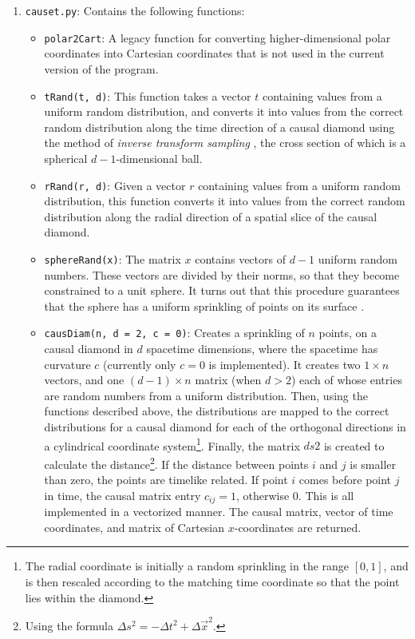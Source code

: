 \documentclass[letterpaper,10pt]{article}
\def\code#1{\texttt{#1}}
\begin{document}
\begin{enumerate}
 \item \code{causet.py}: Contains the following functions:
 \begin{itemize}
  \item \code{polar2Cart}: A legacy function for converting higher-dimensional polar coordinates into Cartesian coordinates that is not used in the 
  current version of the program.
  \item \code{tRand(t, d)}: This function takes a vector $t$ containing values from a uniform random distribution, and converts it into values from  the correct 
  random distribution along the time direction of a causal diamond using the method of {\it inverse transform sampling} \cite{its}, 
  the cross section of which is a spherical $d-1$-dimensional ball. 
  \item \code{rRand(r, d)}: Given a vector $r$ containing values from a uniform random distribution, this function converts it into values from the correct 
  random distribution along the radial direction of a spatial slice of the causal diamond.
  \item \code{sphereRand(x)}: The matrix $x$ contains vectors of $d-1$ uniform random numbers.  These vectors are divided by their norms, so that they 
  become constrained to a unit sphere.  It turns out that this procedure guarantees that the sphere has a uniform sprinkling of points on its surface 
  \cite{cubetosphere}.
  \item \code{causDiam(n, d = 2, c = 0)}:  Creates a sprinkling of $n$ points, on a causal diamond in $d$ spacetime dimensions, where the spacetime has 
  curvature $c$ (currently only $c=0$ is implemented).  It creates two $1\times n$ vectors, and one $(d-1)\times n$ matrix (when $d>2$) each of 
  whose entries are random numbers from a uniform distribution.  Then, using the functions described above, the distributions are mapped to the correct 
  distributions for a causal diamond for each of the orthogonal directions in a cylindrical coordinate system\footnote{The radial coordinate is initially 
  a random sprinkling in the range $[0, 1]$, and is then rescaled according to the matching time coordinate so that the point lies within the diamond.}.  
  Finally, the matrix $ds2$ is created to calculate the distance\footnote{Using the formula $\Delta s^2 = -\Delta t^2 + \Delta\vec{x}^2$.}.  If the distance 
  between points $i$ and $j$ is smaller than zero, the points are timelike related.  If point $i$ comes before point $j$ in time, the causal matrix entry 
  $c_{ij} = 1$, otherwise $0$.  This is all implemented in a vectorized manner.  The causal matrix, vector of time coordinates, and matrix of Cartesian 
  $x$-coordinates are returned.
 

\end{itemize}
\end{enumerate}
\end{document}
